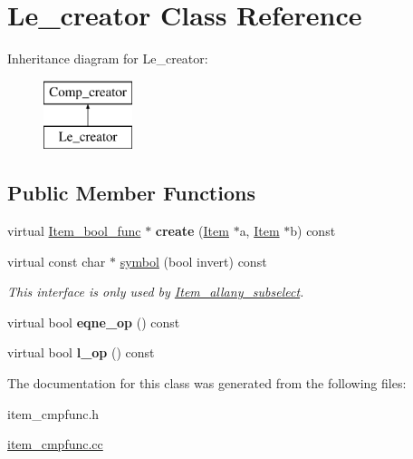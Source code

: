 \hypertarget{classLe__creator}{}\section{Le\+\_\+creator Class Reference}
\label{classLe__creator}
Inheritance diagram for Le\+\_\+creator\+:\begin{figure}[H]
\begin{center}
\leavevmode
\includegraphics[height=2.000000cm]{classLe__creator}
\end{center}
\end{figure}
\subsection*{Public Member Functions}
\begin{DoxyCompactItemize}
\item 
\mbox{\label{classLe__creator_a52ccf665593cec5b2bc797bb159eff8d}} 
virtual \mbox{\hyperlink{classItem__bool__func}{Item\+\_\+bool\+\_\+func}} $\ast$ {\bfseries create} (\mbox{\hyperlink{classItem}{Item}} $\ast$a, \mbox{\hyperlink{classItem}{Item}} $\ast$b) const
\item 
\mbox{\label{classLe__creator_a068c8023af4c52680b661b0d277408df}} 
virtual const char $\ast$ \mbox{\hyperlink{classLe__creator_a068c8023af4c52680b661b0d277408df}{symbol}} (bool invert) const
\begin{DoxyCompactList}\small\item\em This interface is only used by \mbox{\hyperlink{classItem__allany__subselect}{Item\+\_\+allany\+\_\+subselect}}. \end{DoxyCompactList}\item 
\mbox{\label{classLe__creator_a060cea2d27b92a4244d12d20dcc9dc03}} 
virtual bool {\bfseries eqne\+\_\+op} () const
\item 
\mbox{\label{classLe__creator_aca177ca2f4d7c8bb7a3e16cb247637f0}} 
virtual bool {\bfseries l\+\_\+op} () const
\end{DoxyCompactItemize}


The documentation for this class was generated from the following files\+:\begin{DoxyCompactItemize}
\item 
item\+\_\+cmpfunc.\+h\item 
\mbox{\hyperlink{item__cmpfunc_8cc}{item\+\_\+cmpfunc.\+cc}}\end{DoxyCompactItemize}
